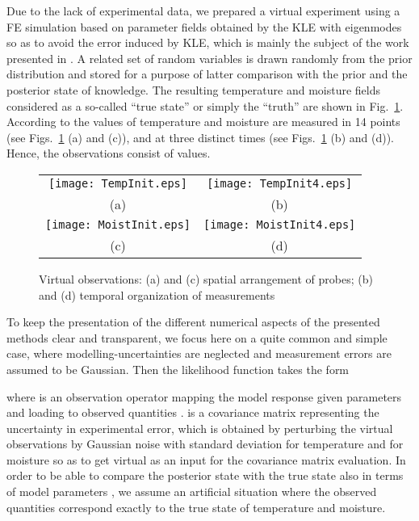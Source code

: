 \documentclass[preprint,12pt]{elsarticle}
\begin{document}
Due to the lack of experimental data, we prepared a virtual
experiment using a FE simulation based on parameter fields
obtained by the KLE with  eigenmodes so as to avoid the error
induced by KLE, which is mainly the subject of the work presented
in \cite{Kucerova:2011:AMC}. A related set of random variables
   is drawn randomly from the prior distribution and stored
  for a purpose of latter comparison with the prior and the posterior
  state of knowledge. The resulting temperature and moisture fields
  considered as a so-called ``true state'' or simply the ``truth'' are
  shown in Fig.~\ref{fig_observations}. According to
\cite{Kucerova:2011:AMC} the values of temperature and moisture
are measured in 14 points (see Figs.~\ref{fig_observations} (a)
and (c)), and at three distinct times (see
Figs.~\ref{fig_observations} (b) and (d)). Hence, the observations
 consist of  values.
\begin{figure} [ht!]
\centering
\begin{tabular}{cc}
\texttt{[image: TempInit.eps]}&
\texttt{[image: TempInit4.eps]}\\
(a)&(b)\\
\texttt{[image: MoistInit.eps]}&
\texttt{[image: MoistInit4.eps]}\\
(c)&(d)
\end{tabular}
\caption{Virtual observations: (a) and (c) spatial arrangement of
  probes; (b) and (d) temporal organization of measurements}
\label{fig_observations}
\end{figure}
To keep the presentation of the different numerical aspects of the
presented methods clear and transparent, we focus here on a quite
common and simple case, where modelling-uncertainties are
neglected and measurement errors are assumed to be Gaussian. Then
the likelihood function takes the form

where  is an observation operator mapping the
model response  given parameters  and loading
 to observed quantities . 
is a covariance matrix representing the uncertainty in
experimental error, which is obtained by perturbing the virtual
observations by Gaussian noise with standard deviation for
temperature   and for
moisture   so as to get
 virtual as an input for the covariance matrix evaluation. In
order to be able to compare the posterior state with the true
state also in terms of model parameters , we assume an
artificial situation where the observed quantities 
correspond exactly to the true state of temperature and moisture.
\end{document}
